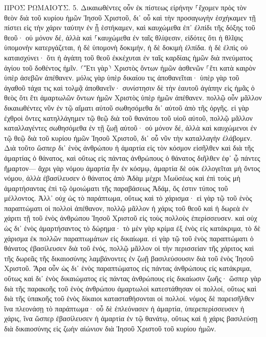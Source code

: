 \documentclass[twoside, 9pt]{extreport}
\begin{document}
ΠΡΟΣ ΡΩΜΑΙΟΥΣ.
5.
Δικαιωθέντες οὖν ἐκ πίστεως εἰρήνην ⸀ἔχομεν πρὸς τὸν θεὸν διὰ τοῦ κυρίου ἡμῶν Ἰησοῦ Χριστοῦ, 
δι᾽ οὗ καὶ τὴν προσαγωγὴν ἐσχήκαμεν τῇ πίστει εἰς τὴν χάριν ταύτην ἐν ᾗ ἑστήκαμεν, καὶ καυχώμεθα ἐπ᾽ ἐλπίδι τῆς δόξης τοῦ θεοῦ· 
οὐ μόνον δέ, ἀλλὰ καὶ ⸀καυχώμεθα ἐν ταῖς θλίψεσιν, εἰδότες ὅτι ἡ θλῖψις ὑπομονὴν κατεργάζεται, 
ἡ δὲ ὑπομονὴ δοκιμήν, ἡ δὲ δοκιμὴ ἐλπίδα. 
ἡ δὲ ἐλπὶς οὐ καταισχύνει· ὅτι ἡ ἀγάπη τοῦ θεοῦ ἐκκέχυται ἐν ταῖς καρδίαις ἡμῶν διὰ πνεύματος ἁγίου τοῦ δοθέντος ἡμῖν. 
⸂Ἔτι γὰρ⸃ Χριστὸς ὄντων ἡμῶν ἀσθενῶν ⸀ἔτι κατὰ καιρὸν ὑπὲρ ἀσεβῶν ἀπέθανεν. 
μόλις γὰρ ὑπὲρ δικαίου τις ἀποθανεῖται· ὑπὲρ γὰρ τοῦ ἀγαθοῦ τάχα τις καὶ τολμᾷ ἀποθανεῖν· 
συνίστησιν δὲ τὴν ἑαυτοῦ ἀγάπην εἰς ἡμᾶς ὁ θεὸς ὅτι ἔτι ἁμαρτωλῶν ὄντων ἡμῶν Χριστὸς ὑπὲρ ἡμῶν ἀπέθανεν. 
πολλῷ οὖν μᾶλλον δικαιωθέντες νῦν ἐν τῷ αἵματι αὐτοῦ σωθησόμεθα δι᾽ αὐτοῦ ἀπὸ τῆς ὀργῆς. 
εἰ γὰρ ἐχθροὶ ὄντες κατηλλάγημεν τῷ θεῷ διὰ τοῦ θανάτου τοῦ υἱοῦ αὐτοῦ, πολλῷ μᾶλλον καταλλαγέντες σωθησόμεθα ἐν τῇ ζωῇ αὐτοῦ· 
οὐ μόνον δέ, ἀλλὰ καὶ καυχώμενοι ἐν τῷ θεῷ διὰ τοῦ κυρίου ἡμῶν Ἰησοῦ Χριστοῦ, δι᾽ οὗ νῦν τὴν καταλλαγὴν ἐλάβομεν. 
Διὰ τοῦτο ὥσπερ δι᾽ ἑνὸς ἀνθρώπου ἡ ἁμαρτία εἰς τὸν κόσμον εἰσῆλθεν καὶ διὰ τῆς ἁμαρτίας ὁ θάνατος, καὶ οὕτως εἰς πάντας ἀνθρώπους ὁ θάνατος διῆλθεν ἐφ᾽ ᾧ πάντες ἥμαρτον— 
ἄχρι γὰρ νόμου ἁμαρτία ἦν ἐν κόσμῳ, ἁμαρτία δὲ οὐκ ἐλλογεῖται μὴ ὄντος νόμου, 
ἀλλὰ ἐβασίλευσεν ὁ θάνατος ἀπὸ Ἀδὰμ μέχρι Μωϋσέως καὶ ἐπὶ τοὺς μὴ ἁμαρτήσαντας ἐπὶ τῷ ὁμοιώματι τῆς παραβάσεως Ἀδάμ, ὅς ἐστιν τύπος τοῦ μέλλοντος. 
Ἀλλ᾽ οὐχ ὡς τὸ παράπτωμα, οὕτως καὶ τὸ χάρισμα· εἰ γὰρ τῷ τοῦ ἑνὸς παραπτώματι οἱ πολλοὶ ἀπέθανον, πολλῷ μᾶλλον ἡ χάρις τοῦ θεοῦ καὶ ἡ δωρεὰ ἐν χάριτι τῇ τοῦ ἑνὸς ἀνθρώπου Ἰησοῦ Χριστοῦ εἰς τοὺς πολλοὺς ἐπερίσσευσεν. 
καὶ οὐχ ὡς δι᾽ ἑνὸς ἁμαρτήσαντος τὸ δώρημα· τὸ μὲν γὰρ κρίμα ἐξ ἑνὸς εἰς κατάκριμα, τὸ δὲ χάρισμα ἐκ πολλῶν παραπτωμάτων εἰς δικαίωμα. 
εἰ γὰρ τῷ τοῦ ἑνὸς παραπτώματι ὁ θάνατος ἐβασίλευσεν διὰ τοῦ ἑνός, πολλῷ μᾶλλον οἱ τὴν περισσείαν τῆς χάριτος καὶ τῆς δωρεᾶς τῆς δικαιοσύνης λαμβάνοντες ἐν ζωῇ βασιλεύσουσιν διὰ τοῦ ἑνὸς Ἰησοῦ Χριστοῦ. 
Ἄρα οὖν ὡς δι᾽ ἑνὸς παραπτώματος εἰς πάντας ἀνθρώπους εἰς κατάκριμα, οὕτως καὶ δι᾽ ἑνὸς δικαιώματος εἰς πάντας ἀνθρώπους εἰς δικαίωσιν ζωῆς· 
ὥσπερ γὰρ διὰ τῆς παρακοῆς τοῦ ἑνὸς ἀνθρώπου ἁμαρτωλοὶ κατεστάθησαν οἱ πολλοί, οὕτως καὶ διὰ τῆς ὑπακοῆς τοῦ ἑνὸς δίκαιοι κατασταθήσονται οἱ πολλοί. 
νόμος δὲ παρεισῆλθεν ἵνα πλεονάσῃ τὸ παράπτωμα· οὗ δὲ ἐπλεόνασεν ἡ ἁμαρτία, ὑπερεπερίσσευσεν ἡ χάρις, 
ἵνα ὥσπερ ἐβασίλευσεν ἡ ἁμαρτία ἐν τῷ θανάτῳ, οὕτως καὶ ἡ χάρις βασιλεύσῃ διὰ δικαιοσύνης εἰς ζωὴν αἰώνιον διὰ Ἰησοῦ Χριστοῦ τοῦ κυρίου ἡμῶν. 
\end{document}
